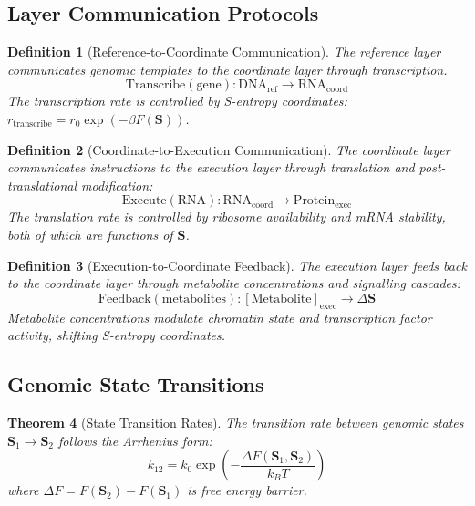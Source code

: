 \documentclass[11pt,a4paper]{article}
\newtheorem{theorem}{Theorem}[section]
\newtheorem{definition}[theorem]{Definition}
\theoremstyle{remark}
\newcommand{\Scoord}{\mathbf{S}}
\begin{document}
\subsection{Layer Communication Protocols}

\begin{definition}[Reference-to-Coordinate Communication]
\label{def:ref_to_coord}
The reference layer communicates genomic templates to the coordinate layer through transcription.
\begin{equation}
\text{Transcribe}(\text{gene}) : \text{DNA}_{\text{ref}} \to \text{RNA}_{\text{coord}}
\end{equation}
The transcription rate is controlled by S-entropy coordinates: $r_{\text{transcribe}} = r_0 \exp(-\beta F(\Scoord))$.
\end{definition}

\begin{definition}[Coordinate-to-Execution Communication]
\label{def:coord_to_exec}
The coordinate layer communicates instructions to the execution layer through translation and post-translational modification:
\begin{equation}
\text{Execute}(\text{RNA}) : \text{RNA}_{\text{coord}} \to \text{Protein}_{\text{exec}}
\end{equation}
The translation rate is controlled by ribosome availability and mRNA stability, both of which are functions of $\Scoord$.
\end{definition}

\begin{definition}[Execution-to-Coordinate Feedback]
\label{def:exec_to_coord}
The execution layer feeds back to the coordinate layer through metabolite concentrations and signalling cascades:
\begin{equation}
\text{Feedback}(\text{metabolites}) : [\text{Metabolite}]_{\text{exec}} \to \Delta\Scoord
\end{equation}
Metabolite concentrations modulate chromatin state and transcription factor activity, shifting S-entropy coordinates.
\end{definition}

\subsection{Genomic State Transitions}

\begin{theorem}[State Transition Rates]
\label{thm:state_transition}
The transition rate between genomic states $\Scoord_1 \to \Scoord_2$ follows the Arrhenius form:
\begin{equation}
k_{12} = k_0 \exp\left(-\frac{\Delta F(\Scoord_1, \Scoord_2)}{k_BT}\right)
\end{equation}
where $\Delta F = F(\Scoord_2) - F(\Scoord_1)$ is free energy barrier.
\end{theorem}
\end{document}
